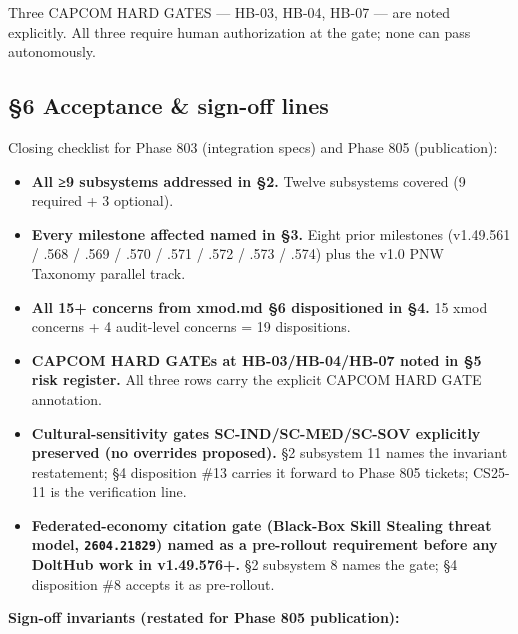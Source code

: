 \documentclass[11pt,letterpaper]{article}
\newcommand{\arxivid}[1]{\texttt{\textcolor{accent}{#1}}}
\providecommand{\tightlist}{\setlength{\itemsep}{0pt}\setlength{\parskip}{0pt}}
\begin{document}
Three CAPCOM HARD GATES --- HB-03, HB-04, HB-07 --- are noted
explicitly. All three require human authorization at the gate; none can
pass autonomously.

\subsection{§6 Acceptance \& sign-off
lines}

Closing checklist for Phase 803 (integration specs) and Phase 805
(publication):

\begin{itemize}
\tightlist
\item[$\boxtimes$]
  \textbf{All ≥9 subsystems addressed in §2.} Twelve subsystems covered
  (9 required + 3 optional).
\item[$\boxtimes$]
  \textbf{Every milestone affected named in §3.} Eight prior milestones
  (v1.49.561 / .568 / .569 / .570 / .571 / .572 / .573 / .574) plus the
  v1.0 PNW Taxonomy parallel track.
\item[$\boxtimes$]
  \textbf{All 15+ concerns from xmod.md §6 dispositioned in §4.} 15 xmod
  concerns + 4 audit-level concerns = 19 dispositions.
\item[$\boxtimes$]
  \textbf{CAPCOM HARD GATEs at HB-03/HB-04/HB-07 noted in §5 risk
  register.} All three rows carry the explicit CAPCOM HARD GATE
  annotation.
\item[$\boxtimes$]
  \textbf{Cultural-sensitivity gates SC-IND/SC-MED/SC-SOV explicitly
  preserved (no overrides proposed).} §2 subsystem 11 names the
  invariant restatement; §4 disposition \#13 carries it forward to Phase
  805 tickets; CS25-11 is the verification line.
\item[$\boxtimes$]
  \textbf{Federated-economy citation gate (Black-Box Skill Stealing
  threat model, \arxivid{2604.21829}) named as a pre-rollout requirement
  before any DoltHub work in v1.49.576+.} §2 subsystem 8 names the gate;
  §4 disposition \#8 accepts it as pre-rollout.
\end{itemize}

\textbf{Sign-off invariants (restated for Phase 805 publication):}
\end{document}

